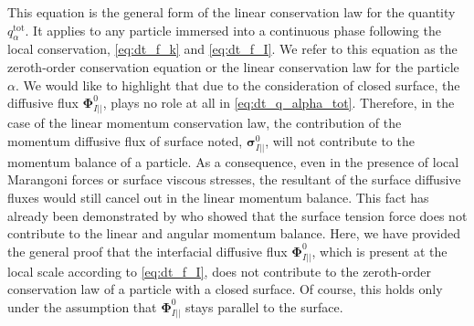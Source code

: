 This equation is the general form of the linear conservation law for the quantity $q_\alpha^\text{tot}$.
It applies to any particle immersed into a continuous phase following the local conservation, \ref{eq:dt_f_k} and \ref{eq:dt_f_I}.
We refer to this equation as the zeroth-order conservation equation or the linear conservation law for the particle $\alpha$.
We would like to highlight that due to the consideration of closed surface, the diffusive flux $\mathbf{\Phi}_{I||}^0$, plays no role at all in \ref{eq:dt_q_alpha_tot}.
Therefore, in the case of the linear momentum conservation law, the contribution of the momentum diffusive flux of surface noted, $\bm\sigma_{I||}^0$, will not contribute to the momentum balance of a particle.
As a consequence, even in the presence of local Marangoni forces or surface viscous stresses, the resultant of the surface diffusive fluxes would still cancel out in the linear momentum balance.
This fact has already been demonstrated by \citet{hesla1993note} who showed that the surface tension force does not contribute to the linear and angular momentum balance. 
Here, we have provided the general proof that the interfacial diffusive flux $\mathbf{\Phi}_{I||}^0$, which is present at the local scale according to \ref{eq:dt_f_I}, does not contribute to the zeroth-order conservation law of a particle with a closed surface.
Of course, this holds only under the assumption that $\mathbf{\Phi}_{I||}^0$ stays parallel to the surface.


